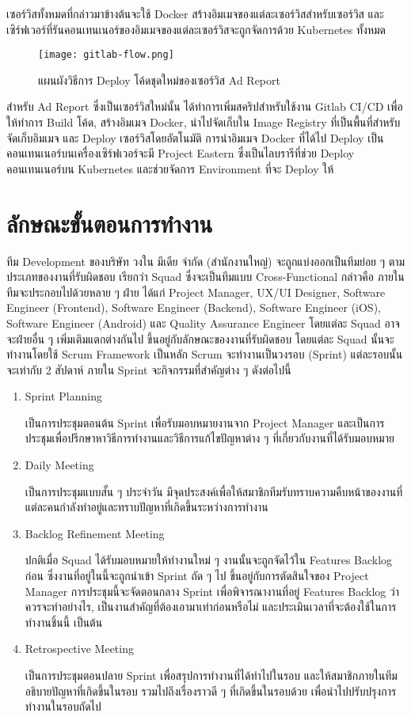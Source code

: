 เซอร์วิสทั้งหมดที่กล่าวมาข้างต้นจะใช้ Docker สร้างอิมเมจของแต่ละเซอร์วิสสำหรับเซอร์วิส และเซิร์ฟเวอร์ที่รันคอนเทนเนอร์ของอิมเมจของแต่ละเซอร์วิสจะถูกจัดการด้วย Kubernetes ทั้งหมด
\begin{figure}[!h]
	\centering
	\texttt{[image: gitlab-flow.png]}  
	\caption{แผนผังวิธีการ Deploy โค้ดชุดใหม่ของเซอร์วิส Ad Report}
	\label{Fig:adreport-diagram}
\end{figure}

สำหรับ Ad Report ซึ่งเป็นเซอร์วิสใหม่นั้น ได้ทำการเพิ่มสคริปสำหรับใช้งาน Gitlab CI/CD เพื่อให้ทำการ Build โค้ด, สร้างอิมเมจ Docker, นำไปจัดเก็บใน Image Registry ที่เป็นพื้นที่สำหรับจัดเก็บอิมเมจ และ Deploy เซอร์วิสโดยอัตโนมัติ การนำอิมเมจ Docker ที่ได้ไป Deploy เป็นคอนเทนเนอร์บนเครื่องเซิร์ฟเวอร์จะมี Project Eastern ซึ่งเป็นไลบรารีที่ช่วย Deploy คอนเทนเนอร์บน Kubernetes และช่วยจัดการ Environment ที่จะ Deploy ให้ ~\cite{eastern} 

\section{ลักษณะขั้นตอนการทำงาน}
ทีม Development ของบริษัท วงใน มีเดีย จำกัด (สำนักงานใหญ่) จะถูกแบ่งออกเป็นทีมย่อย ๆ ตามประเภทของงานที่รับผิดชอบ เรียกว่า Squad ซึ่งจะเป็นทีมแบบ Cross-Functional กล่าวคือ ภายในทีมจะประกอบไปด้วยหลาย ๆ ฝ่าย ได้แก่ Project Manager, UX/UI Designer, Software Engineer (Frontend), Software Engineer (Backend), Software Engineer (iOS), Software Engineer (Android) และ Quality Assurance Engineer โดยแต่ละ Squad อาจจะฝ่ายอื่น ๆ เพิ่มเติมแตกต่างกันไป ขึ้นอยู่กับลักษณะของงานที่รับผิดชอบ โดยแต่ละ Squad นั้นจะทำงานโดยใช้ Scrum Framework เป็นหลัก Scrum จะทำงานเป็นวงรอบ (Sprint) แต่ละรอบนั้นจะเท่ากับ 2 สัปดาห์ ภายใน Sprint จะกิจกรรมที่สำคัญต่าง ๆ ดังต่อไปนี้
\begin{enumerate}
	\item Sprint Planning
	
	เป็นการประชุมตอนต้น Sprint เพื่อรับมอบหมายงานจาก Project Manager และเป็นการประชุมเพื่อปรึกษาหาวิธีการทำงานและวิธีการแก้ไขปัญหาต่าง ๆ ที่เกี่ยวกับงานที่ได้รับมอบหมาย
	
	\item Daily Meeting
	
	เป็นการประชุมแบบสั้น ๆ ประจำวัน มีจุดประสงค์เพื่อให้สมาชิกทีมรับทราบความคืบหน้าของงานที่แต่ละคนกำลังทำอยู่และทราบปัญหาที่เกิดขึ้นระหว่างการทำงาน
	
	\item Backlog Refinement Meeting
	
	ปกติเมื่อ Squad ได้รับมอบหมายให้ทำงานใหม่ ๆ งานนั้นจะถูกจัดไว้ใน Features Backlog ก่อน ซึ่งงานที่อยู่ในนี้จะถูกนำเข้า Sprint ถัด ๆ ไป ขึ้นอยู่กับการตัดสินใจของ Project Manager การประชุมนี้จะจัดตอนกลาง Sprint เพื่อพิจารณางานที่อยู่ Features Backlog ว่าควรจะทำอย่างไร, เป็นงานสำคัญที่ต้องเอามาเท่าก่อนหรือไม่ และประเมินเวลาที่จะต้องใช้ในการทำงานชิ้นนี้ เป็นต้น
	
	\item Retrospective Meeting
	
	เป็นการประชุมตอนปลาย Sprint เพื่อสรุปการทำงานที่ได้ทำไปในรอบ และให้สมาชิกภายในทีมอธิบายปัญหาที่เกิดขึ้นในรอบ รวมไปถึงเรื่องราวดี ๆ ที่เกิดขึ้นในรอบด้วย เพื่อนำไปปรับปรุงการทำงานในรอบถัดไป
\end{enumerate}

